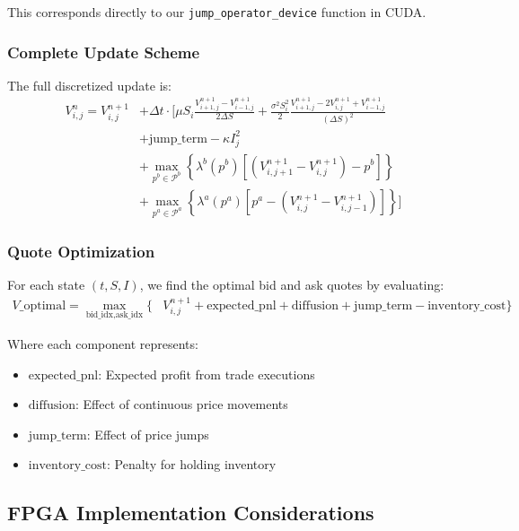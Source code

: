 \documentclass[onecolumn,ieee]{arithmaxresearch}
\begin{document}
This corresponds directly to our \texttt{jump\_operator\_device} function in CUDA.

\subsubsection{Complete Update Scheme}
The full discretized update is:
\begin{equation}
\begin{aligned}
V^n_{i,j} = V^{n+1}_{i,j} &+ \Delta t \cdot \Bigg[\mu S_i \frac{V^{n+1}_{i+1,j} - V^{n+1}_{i-1,j}}{2\Delta S} + \frac{\sigma^2 S_i^2}{2}\frac{V^{n+1}_{i+1,j} - 2V^{n+1}_{i,j} + V^{n+1}_{i-1,j}}{(\Delta S)^2} \\
&+ \text{jump\_term} - \kappa I_j^2 \\
&+ \max_{p^b \in \mathcal{P}^b} \left\{\lambda^b(p^b) \left[(V^{n+1}_{i,j+1} - V^{n+1}_{i,j}) - p^b\right]\right\} \\
&+ \max_{p^a \in \mathcal{P}^a} \left\{\lambda^a(p^a) \left[p^a - (V^{n+1}_{i,j} - V^{n+1}_{i,j-1})\right]\right\}\Bigg]
\end{aligned}
\end{equation}

\subsubsection{Quote Optimization}
For each state $(t, S, I)$, we find the optimal bid and ask quotes by evaluating:
\begin{equation}
\begin{aligned}
V\_\text{optimal} = \max_{\text{bid\_idx}, \text{ask\_idx}} \Bigg\{ &V^{n+1}_{i,j} + \text{expected\_pnl} + \text{diffusion} + \text{jump\_term} - \text{inventory\_cost}\Bigg\}
\end{aligned}
\end{equation}

Where each component represents:
\begin{itemize}
    \item $\text{expected\_pnl}$: Expected profit from trade executions
    \item $\text{diffusion}$: Effect of continuous price movements
    \item $\text{jump\_term}$: Effect of price jumps
    \item $\text{inventory\_cost}$: Penalty for holding inventory
\end{itemize}

\subsection{FPGA Implementation Considerations}
\end{document}
